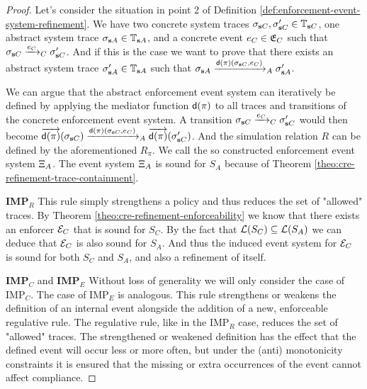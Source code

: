 \begin{proof}
    Let's consider the situation in point 2 of 
    Definition \ref{def:enforcement-event-system-refinement}.
    We have two concrete system traces
    $\sigma_{\sys C}, \sigma_{\sys C}' \in \Traces_{\sys C}$,
    one abstract system trace
    $\sigma_{\sys A} \in \Traces_{\sys A}$, and a concrete event
    $e_C \in \Eventspace_C$ such that
    $\sigma_{\sys C} \Transitionrelation{C}{e_C} \sigma_{\sys C}'$.
    And if this is the case we want to prove that there
    exists an abstract system trace
    $\sigma_{\sys A}' \in \Traces_{\sys A}$ such that
    $\sigma_{\sys A} \Transitionrelation{A}{\dConv(\pi)(\sigma_{\sys C}, e_C)} \sigma_{\sys A}'$.

    We can argue that the abstract enforcement event system can
    iteratively be defined by applying the mediator function $\dConv(\pi)$
    to all traces and transitions of the concrete enforcement event system.
    A transition 
    $\sigma_{\sys C} \Transitionrelation{C}{e_C} \sigma_{\sys C}'$
    would then become
    $\overrightarrow{\dConv(\pi)}(\sigma_{\sys C})
    \Transitionrelation{A}{\dConv(\pi)(\sigma_{\sys C}, e_C)}
    \overrightarrow{\dConv(\pi)}(\sigma_{\sys C}')$.
    And the simulation relation $R$ can be defined by the aforementioned
    $R_\pi$.
    We call the so constructed enforcement event system $\EventSystem_A$.
    The event system $\EventSystem_A$ is sound for $S_A$ because
    of Theorem \ref{theo:cre-refinement-trace-containment}.

    \textbf{IMP$_R$}
    This rule simply strengthens a policy and thus reduces the
    set of "allowed" traces.
    By Theorem \ref{theo:cre-refinement-enforceability}
    we know that there exists an enforcer $\Enforcer_C$
    that is sound for $S_C$.
    By the fact that $\Language(S_C) \subseteq \Language(S_A)$
    we can deduce that $\Enforcer_C$ is also
    sound for $S_A$.
    And thus the induced event system for $\Enforcer_C$
    is sound for both $S_C$ and $S_A$,
    and also a refinement of itself.

    \textbf{IMP$_C$} and \textbf{IMP$_E$}
    Without loss of generality we will only consider
    the case of IMP$_C$.
    The case of IMP$_E$ is analogous.
    This rule strengthens or weakens the definition of
    an internal event alongside
    the addition of a new, enforceable regulative rule.
    The regulative rule, like in the IMP$_R$ case,
    reduces the set of "allowed" traces.
    The strengthened or weakened definition has
    the effect that the defined event will occur less
    or more often, but under the (anti) monotonicity
    constraints it is ensured that the missing or extra
    occurrences of the event cannot affect compliance.


\end{proof}
